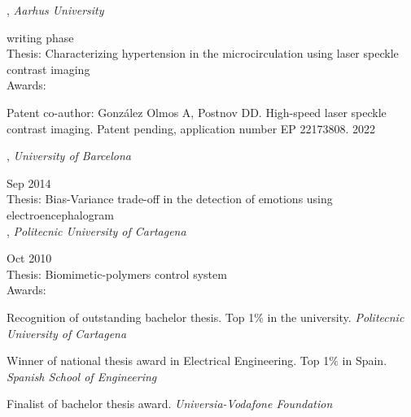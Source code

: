 
,
\textit{Aarhus University}\strut \hfill writing phase\\
Thesis: Characterizing hypertension in the microcirculation using laser speckle contrast imaging\\
Awards: \\
\vspace*{\spaceAfterField}
\begin{zitemize}
\item Patent co-author: Gonz\'alez Olmos A, Postnov DD. High-speed laser speckle contrast imaging. Patent pending, application number EP 22173808.
 \hfill 2022
\end{zitemize}

,
\textit{University of Barcelona}\strut \hfill Sep 2014\\
Thesis: Bias-Variance trade-off in the detection of emotions using electroencephalogram\\

,
\textit{Politecnic University of Cartagena}\strut \hfill Oct 2010\\
Thesis: Biomimetic-polymers control system\\
Awards: \\
\vspace*{\spaceAfterField}
\begin{zitemize}
\item Recognition of outstanding bachelor thesis. Top 1\% in the university. \textit{Politecnic University of Cartagena}
\item Winner of national thesis award in Electrical Engineering. Top 1\% in Spain. \textit{Spanish School of Engineering} 
\item Finalist of bachelor thesis award. \textit{Universia-Vodafone Foundation} 
\end{zitemize}

